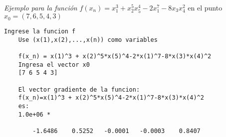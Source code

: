 \documentclass[12pt,oneside]{book}
\begin{document}
\textit{Ejemplo para la función} $f(x_n) = x_1^3+x_2^5x_5^4-2x_1^7-8x_3x_4^2$ en el punto $x_0 = (7,6,5,4,3)$

\begin{lstlisting}[frame=single]
    Ingrese la funcion f
    Use (x(1),x(2),...,x(n)) como variables

    f(x_n) = x(1)^3 + x(2)^5*x(5)^4-2*x(1)^7-8*x(3)*x(4)^2
    Ingresa el vector x0
    [7 6 5 4 3]

    El vector gradiente de la funcion:
    f(x_n)=x(1)^3 + x(2)^5*x(5)^4-2*x(1)^7-8*x(3)*x(4)^2
    es:
    1.0e+06 *

        -1.6486    0.5252   -0.0001   -0.0003    0.8407
\end{lstlisting}
\end{document}
